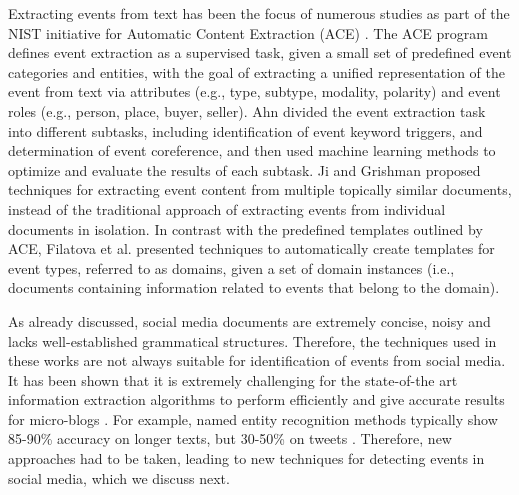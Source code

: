 Extracting events from text has been the focus of numerous studies as part of the NIST initiative for Automatic Content Extraction (ACE) \cite{ahn2006stages,ji2008refining}. The ACE program defines event extraction as a supervised task, given a small set of predefined event categories and entities, with the goal of extracting a unified representation of the event from text
via attributes (e.g., type, subtype, modality, polarity) and event roles (e.g., person, place, buyer, seller). Ahn \cite{ahn2006stages} divided the event extraction task into different subtasks, including identification of event keyword triggers, and determination of event
coreference, and then used machine learning methods to optimize and evaluate the results of each subtask. Ji and Grishman \cite{ji2008refining} proposed techniques for extracting event content from multiple topically similar documents, instead of the traditional approach of extracting events from individual documents in isolation. In contrast with the predefined templates outlined by ACE, Filatova et al. \cite{filatova2006automatic} presented techniques to automatically create templates for event types, referred to as domains, given a set of domain instances (i.e., documents containing information related to events that belong to the domain). 

As already discussed, social media documents are extremely concise, noisy and lacks well-established grammatical structures. Therefore, the techniques used in these works are not always suitable for identification of events from social media.  It has been shown that it is extremely challenging for the state-of-the art information extraction algorithms to perform efficiently and give accurate results for micro-blogs \cite{derczynski2013microblog}. For example, named entity recognition methods typically show 85-90\% accuracy on longer texts, but 30-50\% on tweets \cite{ritter2011named}. Therefore, new approaches had to be taken, leading to new techniques for detecting events in social media, which we discuss next.


